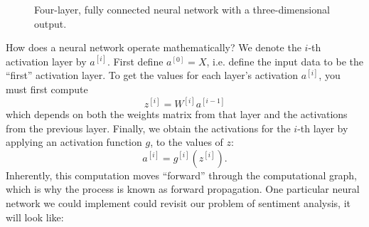\documentclass[12pt]{article}
\begin{document}
\begin{figure}[h]
  \caption{Four-layer, fully connected neural network with a three-dimensional output.} \end{figure}

How does a neural network operate mathematically? We denote the $i$-th activation layer by $a^{[i]}$. First define $a^{[0]} = X$, i.e. define the input data to be the ``first'' activation layer. To get the values for each layer's activation $a^{[i]}$, you must first compute
\[
  z^{[i]} = W^{[i]} a^{[i-1]}
\]
which depends on both the weights matrix from that layer and the activations from the previous layer. Finally, we obtain the activations for the $i$-th layer by applying an activation function $g$, to the values of $z$:
\[
  a^{[i]} = g^{[i]}(z^{[i]}).
\]
Inherently, this computation moves ``forward'' through the computational graph, which is why the process is known as forward propagation. One particular neural network we could implement could revisit our problem of sentiment analysis, it will look like:
\end{document}
